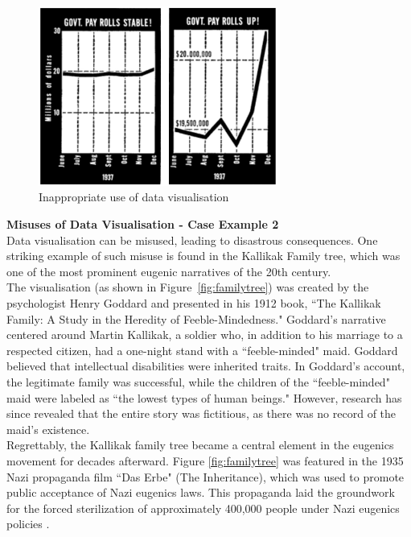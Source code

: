 \documentclass{article}\usepackage[]{graphicx}\usepackage[]{xcolor}
\begin{document}
\begin{figure}[H]
    \centering
    \includegraphics[width=0.7\textwidth]{misuse1.png}
    \caption{Inappropriate use of data visualisation\cite{lie}}
    \label{fig:misuse1}
\end{figure}

\noindent 
\textbf{Misuses of Data Visualisation - Case Example 2}\\

\noindent
Data visualisation can be misused, leading to disastrous consequences. One striking example of such misuse is found in the Kallikak Family tree, which was one of the most prominent eugenic narratives of the 20th century.\\

\noindent
The visualisation (as shown in Figure~\ref{fig:familytree}) was created by the psychologist Henry Goddard and presented in his 1912 book, ``The Kallikak Family: A Study in the Heredity of Feeble-Mindedness." Goddard's narrative centered around Martin Kallikak, a soldier who, in addition to his marriage to a respected citizen, had a one-night stand with a ``feeble-minded" maid. Goddard believed that intellectual disabilities were inherited traits. In Goddard's account, the legitimate family was successful, while the children of the ``feeble-minded" maid were labeled as ``the lowest types of human beings." However, research has since revealed that the entire story was fictitious, as there was no record of the maid's existence\cite{fakedata}.\\

\noindent
Regrettably, the Kallikak family tree became a central element in the eugenics movement for decades afterward. Figure \ref{fig:familytree} was featured in the 1935 Nazi propaganda film ``Das Erbe" (The Inheritance), which was used to promote public acceptance of Nazi eugenics laws. This propaganda laid the groundwork for the forced sterilization of approximately 400,000 people under Nazi eugenics policies \cite{eugenics}.
\end{document}
